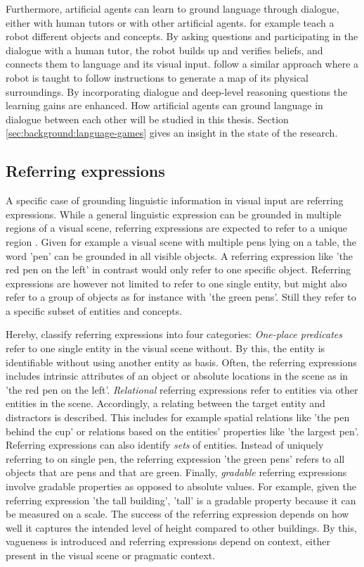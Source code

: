 Furthermore, artificial agents can learn to ground language through dialogue, either with human tutors or with other artificial agents.
\citet{Skocaj2011} for example teach a robot different objects and concepts.
By asking questions and participating in the dialogue with a human tutor, the robot builds up and verifies beliefs, and connects them to language and its visual input.
\citet{Lauria2001} follow a similar approach where a robot is taught to follow instructions to generate a map of its physical surroundings.
By incorporating dialogue and deep-level reasoning questions the learning gains are enhanced.
How artificial agents can ground language in dialogue between each other will be studied in this thesis.
Section \ref{sec:background:language-games} gives an insight in the state of the research.


\subsection{Referring expressions}
\label{sec:background:re}
A specific case of grounding linguistic information in visual input are referring expressions.
While a general linguistic expression can be grounded in multiple regions of a visual scene, referring expressions are expected to refer to a unique region \citep{Sanchez2022}.
Given for example a visual scene with multiple pens lying on a table, the word 'pen' can be grounded in all visible objects.
A referring expression like 'the red pen on the left' in contrast would only refer to one specific object.
Referring expressions are however not limited to refer to one single entity, but might also refer to a group of objects as for instance with 'the green pens'.
Still they refer to a specific subset of entities and concepts.

Hereby, \citet{Krahmer2012} classify referring expressions into four categories:
\emph{One-place predicates} refer to one single entity in the visual scene without.
By this, the entity is identifiable without using another entity as basis.
Often, the referring expressions includes intrinsic attributes of an object or absolute locations in the scene as in 'the red pen on the left'.
\emph{Relational} referring expressions refer to entities via other entities in the scene.
Accordingly, a relating between the target entity and distractors is described.
This includes for example spatial relations like 'the pen behind the cup' or relations based on the entities' properties like 'the largest pen'.
Referring expressions can also identify \emph{sets} of entities.
Instead of uniquely referring to on single pen, the referring expression 'the green pens' refers to all objects that are pens and that are green.
Finally, \emph{gradable} referring expressions involve gradable properties as opposed to absolute values.
For example, given the referring expression 'the tall building', 'tall' is a gradable property because it can be measured on a scale.
The success of the referring expression depends on how well it captures the intended level of height compared to other buildings.
By this, vagueness is introduced and referring expressions depend on context, either present in the visual scene or pragmatic context.

